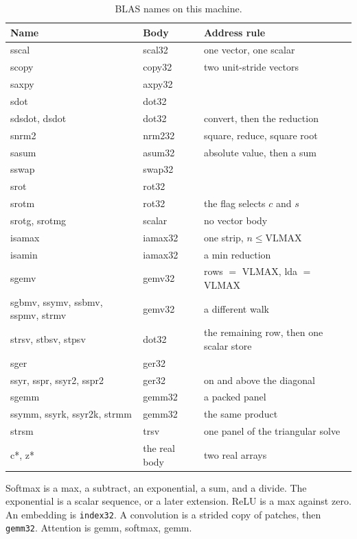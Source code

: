 \begin{table}[htbp]
\centering
\caption{BLAS names on this machine.}
\begingroup
\footnotesize
\setlength{\tabcolsep}{3pt}
\begin{tabular}{@{}p{5.2cm}p{2.2cm}p{5.6cm}@{}}
\toprule
Name & Body & Address rule \\
\midrule
sscal & scal32 & one vector, one scalar \\
scopy & copy32 & two unit-stride vectors \\
saxpy & axpy32 & \\
sdot & dot32 & \\
sdsdot, dsdot & dot32 & convert, then the reduction \\
snrm2 & nrm232 & square, reduce, square root \\
sasum & asum32 & absolute value, then a sum \\
sswap & swap32 & \\
srot & rot32 & \\
srotm & rot32 & the flag selects $c$ and $s$ \\
srotg, srotmg & scalar & no vector body \\
isamax & iamax32 & one strip, $n \le \mathrm{VLMAX}$ \\
isamin & iamax32 & a min reduction \\
sgemv & gemv32 & rows $=$ VLMAX, lda $=$ VLMAX \\
sgbmv, ssymv, ssbmv, sspmv, strmv & gemv32 & a different walk \\
strsv, stbsv, stpsv & dot32 & the remaining row, then one scalar store \\
sger & ger32 & \\
ssyr, sspr, ssyr2, sspr2 & ger32 & on and above the diagonal \\
sgemm & gemm32 & a packed panel \\
ssymm, ssyrk, ssyr2k, strmm & gemm32 & the same product \\
strsm & trsv & one panel of the triangular solve \\
c*, z* & the real body & two real arrays \\
\bottomrule
\end{tabular}
\endgroup
\end{table}

Softmax is a max, a subtract, an exponential, a sum, and a divide. The exponential is a scalar sequence, or a later extension. ReLU is a max against zero. An embedding is \texttt{index32}. A convolution is a strided copy of patches, then \texttt{gemm32}. Attention is gemm, softmax, gemm.

